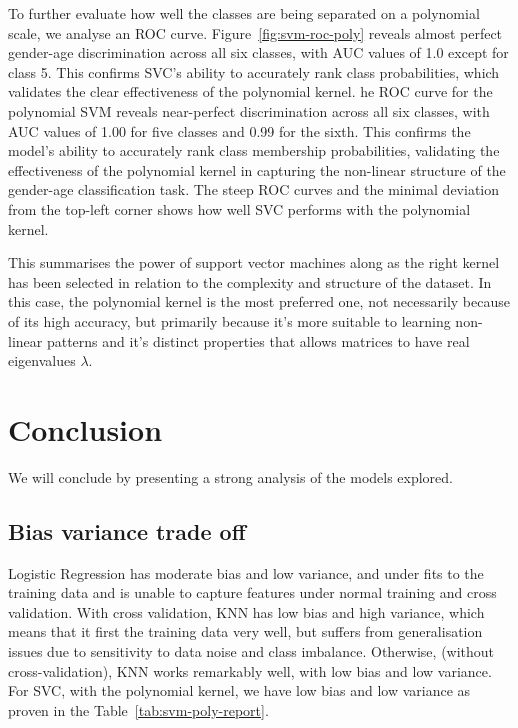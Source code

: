 \documentclass[10pt,twocolumn]{article}
\begin{document}
To further evaluate how well the classes are being separated on a polynomial scale, we analyse an ROC curve. Figure~\ref{fig:svm-roc-poly} reveals almost perfect gender-age discrimination across all six classes, with AUC values of 1.0 except for class 5. This confirms  SVC's ability to accurately rank class probabilities, which validates the clear effectiveness of the polynomial kernel.
he ROC curve for the polynomial SVM reveals near-perfect discrimination across all six classes, with AUC values of 1.00 for five classes and 0.99 for the sixth. This confirms the model’s ability to accurately rank class membership probabilities, validating the effectiveness of the polynomial kernel in capturing the non-linear structure of the gender-age classification task. The steep ROC curves and the minimal deviation from the top-left corner shows how well SVC performs with the polynomial kernel.

This summarises the power of support vector machines along as the right kernel has been selected in relation to the complexity and structure of the dataset. In this case, the polynomial kernel is the most preferred one, not necessarily because of its high accuracy, but primarily because it's more suitable to learning non-linear patterns and it's distinct properties that allows matrices to have real eigenvalues $\lambda$.
\section{Conclusion}
We will conclude by presenting a strong analysis of the models explored.
\subsection{Bias variance trade off}
Logistic Regression has moderate bias and low variance, and under fits to the training data and is unable to capture features under normal training and cross validation. With cross validation, KNN has low bias and high variance, which means that it first the training data very well, but suffers from generalisation issues due to sensitivity to data noise and class imbalance. Otherwise, (without cross-validation), KNN works remarkably well, with low bias and low variance. For SVC, with the polynomial kernel, we have low bias and low variance as proven in the Table~\ref{tab:svm-poly-report}.
\end{document}
